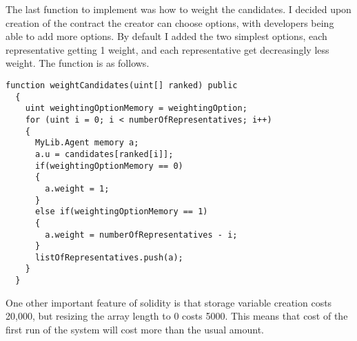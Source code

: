 The last function to implement was how to weight the candidates. I decided upon creation of the contract the creator can choose options, with developers being able to add more options. By default I added the two simplest options, each representative getting 1 weight, and each representative get decreasingly less weight. The function is as follows.
\begin{lstlisting}
function weightCandidates(uint[] ranked) public
  {
    uint weightingOptionMemory = weightingOption;
    for (uint i = 0; i < numberOfRepresentatives; i++)
    {
      MyLib.Agent memory a;
      a.u = candidates[ranked[i]];
      if(weightingOptionMemory == 0)
      {
        a.weight = 1;
      }
      else if(weightingOptionMemory == 1)
      {
        a.weight = numberOfRepresentatives - i;
      }
      listOfRepresentatives.push(a);
    }
  }
\end{lstlisting}
One other important feature of solidity is that storage variable creation costs 20,000, but resizing the array length to 0 costs 5000. This means that cost of the first run of the system will cost more than the usual amount. 
